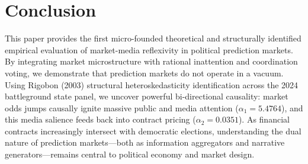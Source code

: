 \documentclass[12pt, a4paper]{article}
\begin{document}
\section{Conclusion}
\label{sec:conclusion}

This paper provides the first micro-founded theoretical and structurally identified empirical evaluation of market-media reflexivity in political prediction markets. By integrating market microstructure with rational inattention and coordination voting, we demonstrate that prediction markets do not operate in a vacuum. Using Rigobon (2003) structural heteroskedasticity identification across the 2024 battleground state panel, we uncover powerful bi-directional causality: market odds jumps causally ignite massive public and media attention ($\alpha_1 = 5.4764$), and this media salience feeds back into contract pricing ($\alpha_2 = 0.0351$). As financial contracts increasingly intersect with democratic elections, understanding the dual nature of prediction markets---both as information aggregators and narrative generators---remains central to political economy and market design.
\end{document}
